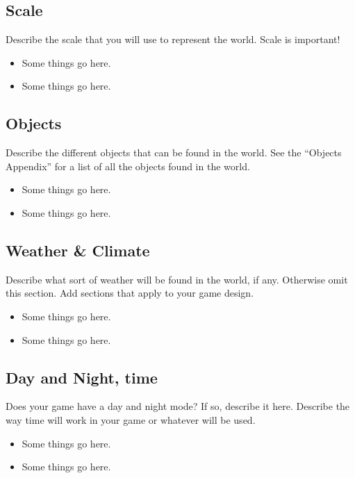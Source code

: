 \documentclass[11pt]{article}
\begin{document}
    \subsection{Scale}
      Describe the scale that you will use to represent the world. Scale is important!
      \begin{itemize}
          \item Some things go here.
          \item Some things go here.
      \end{itemize}

    \subsection{Objects}
      Describe the different objects that can be found in the world. See the “Objects Appendix” for a list of all the objects found in the world.
      \begin{itemize}
          \item Some things go here.
          \item Some things go here.
      \end{itemize}

    \subsection{Weather \& Climate}
      Describe what sort of weather will be found in the world, if any. Otherwise omit this section. Add sections that apply to your game design.
      \begin{itemize}
          \item Some things go here.
          \item Some things go here.
      \end{itemize}

    \subsection{Day and Night, time}
      Does your game have a day and night mode? If so, describe it here. Describe the way time will work in your game or whatever will be used.
      \begin{itemize}
          \item Some things go here.
          \item Some things go here.
      \end{itemize}

\end{document}

